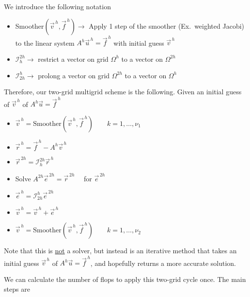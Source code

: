 We introduce the following notation
\begin{itemize}[{label={}}]
\item Smoother$(\vec{v}^{\,h}, \vec{f}^{\,h}) \rightarrow$ Apply 1 step of the
smoother (Ex.\ weighted Jacobi) to the linear system $A^h\vec{u}^{\,h}
=\vec{f}^{\,h}$ with initial guess $\vec{v}^{\,h}$

\item $\mathcal{I}_{h}^{2h} \rightarrow$ restrict a vector on grid $\Omega^h$ to a
vector on $\Omega^{2h}$

\item $\mathcal{I}_{2h}^{h} \rightarrow$ prolong a vector on grid $\Omega^{2h}$ to a
vector on $\Omega^{h}$
\end{itemize}

Therefore, our two-grid multigrid scheme is the following. Given an initial
guess of $\vec{v}^{\,h}$ of $A^h\vec{u} =\vec{f}^{\,h}$

\begin{itemize}{}
\item $\vec{v}^{\,h} = \text{Smoother}(\vec{v}^{\,h}, \vec{f}^{\,h}) \qquad k=1, \ldots, \nu_1$
\item $\vec{r}^{\,h} = \vec{f}^{\,h} - A^h\vec{v}^{\,h}$
\item $\vec{r}^{\,2h} = \mathcal{I}_{h}^{2h}\vec{r}^{\,h}$
\item Solve $A^{2h}\vec{e}^{\,2h} = \vec{r}^{\,2h} \quad$ for $\vec{e}^{\,2h}$
\item $\vec{e}^{\,h} = \mathcal{I}_{2h}^{h}\vec{e}^{\,2h}$
\item $\vec{v}^{\,h} = \vec{v}^{\,h} + \vec{e}^{\,h}$
\item $\vec{v}^{\,h} = \text{Smoother}(\vec{v}^{\,h}, \vec{f}^{\,h}) \qquad k=1, \ldots, \nu_2$
\end{itemize}


Note that this is \underline{not} a solver, but instead is an iterative method
that takes an initial guess $\vec{v}^{\,h}$ of $A^h\vec{u} = \vec{f}^{\,h}$, and
hopefully returns a more accurate solution.

We can calculate the number of flops to apply this two-grid cycle once. The main
steps are

